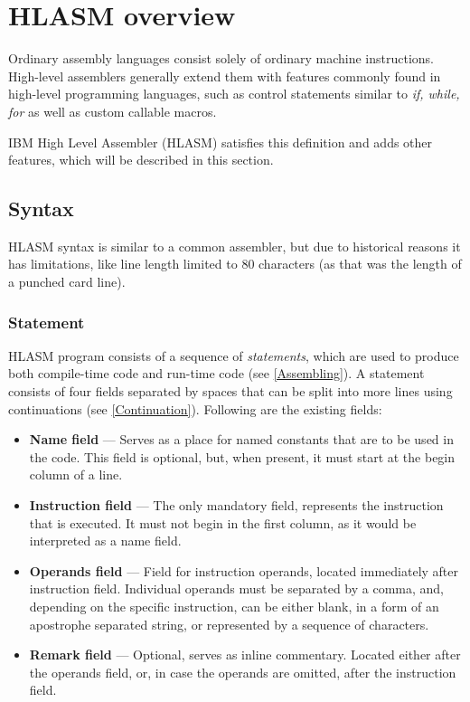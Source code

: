 \chapter{HLASM overview}

Ordinary assembly languages consist solely of ordinary machine instructions. High-level assemblers generally extend them with features commonly found in high-level programming languages, such as control statements similar to \emph{if, while, for} as well as custom callable macros.

IBM High Level Assembler (HLASM) satisfies this definition and adds other features, which will be described in this section.

\section{Syntax}

HLASM syntax is similar to a common assembler, but due to historical reasons it has limitations, like line length limited to 80 characters (as that was the length of a punched card line).

\subsection{Statement}

HLASM program consists of a sequence of \emph{statements}, which are used to produce both compile-time code and run-time code (see \cref{Assembling}). A statement consists of four fields separated by spaces that can be split into more lines using continuations (see \cref{Continuation}). Following are the existing fields:
\begin{itemize}
	\item \textbf{Name field} --- Serves as a place for named constants that are to be used in the code. This field is optional, but, when present, it must start at the begin column of a line.
	
	\item \textbf{Instruction field} --- The only mandatory field, represents the instruction that is executed. It must not begin in the first column, as it would be interpreted as a name field.
	
	\item \textbf{Operands field} --- Field for instruction operands, located immediately after instruction field. Individual operands must be separated by a comma, and, depending on the specific instruction, can be either blank, in a form of an apostrophe separated string, or represented by a sequence of characters.
	
	\item \textbf{Remark field} --- Optional, serves as inline commentary. Located either after the operands field, or, in case the operands are omitted, after the instruction field. 
\end{itemize}

